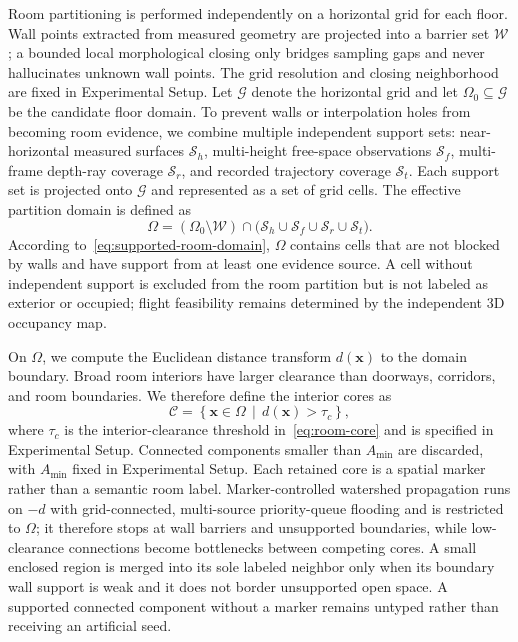 \documentclass[letterpaper,10pt,journal]{IEEEtran}
\begin{document}
Room partitioning is performed independently on a horizontal grid for each floor. Wall points extracted from measured geometry are projected into a barrier set $\mathcal W$; a bounded local morphological closing only bridges sampling gaps and never hallucinates unknown wall points. The grid resolution and closing neighborhood are fixed in Experimental Setup. Let $\mathcal G$ denote the horizontal grid and let $\Omega_0\subseteq\mathcal G$ be the candidate floor domain. To prevent walls or interpolation holes from becoming room evidence, we combine multiple independent support sets: near-horizontal measured surfaces $\mathcal S_h$, multi-height free-space observations $\mathcal S_f$, multi-frame depth-ray coverage $\mathcal S_r$, and recorded trajectory coverage $\mathcal S_t$. Each support set is projected onto $\mathcal G$ and represented as a set of grid cells. The effective partition domain is defined as
\begin{equation}
\Omega=(\Omega_0\setminus\mathcal W)\cap
\bigl(\mathcal S_h\cup\mathcal S_f\cup\mathcal S_r\cup\mathcal S_t\bigr).
\label{eq:supported-room-domain}
\end{equation}
According to~\eqref{eq:supported-room-domain}, $\Omega$ contains cells that are not blocked by walls and have support from at least one evidence source. A cell without independent support is excluded from the room partition but is not labeled as exterior or occupied; flight feasibility remains determined by the independent 3D occupancy map.

On $\Omega$, we compute the Euclidean distance transform $d(\mathbf{x})$ to the domain boundary. Broad room interiors have larger clearance than doorways, corridors, and room boundaries. We therefore define the interior cores as
\begin{equation}
\mathcal C=\left\{\mathbf{x}\in\Omega\,\middle|\,
d(\mathbf{x})>\tau_c\right\},
\label{eq:room-core}
\end{equation}
where $\tau_c$ is the interior-clearance threshold in~\eqref{eq:room-core} and is specified in Experimental Setup. Connected components smaller than $A_{\min}$ are discarded, with $A_{\min}$ fixed in Experimental Setup. Each retained core is a spatial marker rather than a semantic room label. Marker-controlled watershed propagation runs on $-d$ with grid-connected, multi-source priority-queue flooding and is restricted to $\Omega$; it therefore stops at wall barriers and unsupported boundaries, while low-clearance connections become bottlenecks between competing cores. A small enclosed region is merged into its sole labeled neighbor only when its boundary wall support is weak and it does not border unsupported open space. A supported connected component without a marker remains untyped rather than receiving an artificial seed.
\end{document}
